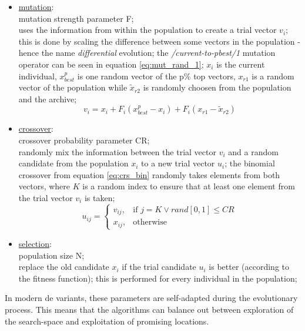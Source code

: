 \documentclass[./\jobname.tex,hidelinks]{subfiles}
\begin{document}
\begin{itemize}
	\item \underline{mutation}: \\
		  mutation strength parameter F;\\
		  uses the information from within the population to create a trial vector $v_i$;\\
		  this is done by scaling the difference between some vectors in the population - hence the name \textit{differential} evolution; the \textit{/current-to-pbest/1} mutation operator can be seen in equation \ref{eq:mut_rand_1}; $x_i$ is the current individual, $x_{best}^p$ is one random vector of the p\% top vectors, $x_{r1}$ is a random vector of the population while $\tilde{x}_{r2}$ is randomly choosen from the population and the archive;
		  \begin{equation}
		  \label{eq:mut_rand_1}
		  v_i = x_{i} + F_i(x_{best}^p - x_{i}) + F_i(x_{r1} - \tilde{x}_{r2})
		  \end{equation}
	\item \underline{crossover}: \\
		  crossover probability parameter CR;\\
		  randomly mix the information between the trial vector $v_i$ and a random candidate from the population $x_{i}$ to a new trial vector $u_i$; the binomial crossover from equation \ref{eq:crs_bin} randomly takes elements from both vectors, where $K$ is a random index to ensure that at least one element from the trial vector $v_i$ is taken;
		  \begin{equation}
		  \label{eq:crs_bin}
		  u_{ij}=\begin{cases}
		  v_{ij}, &\text{if $j = K \lor rand[0,1] \leq CR$}\\
		  x_{ij}, &\text{otherwise}
		  \end{cases}
		  \end{equation}
	\item \underline{selection}: \\
		  population size N;\\
		  replace the old candidate $x_i$ if the trial candidate $u_i$ is better (according to the fitness function); this is performed for every individual in the population;
\end{itemize}  

In modern \gls{de} variants, these parameters are self-adapted during the evolutionary process. This means that the algorithms can balance out between exploration of the search-space and exploitation of promising locations. 
\end{document}
